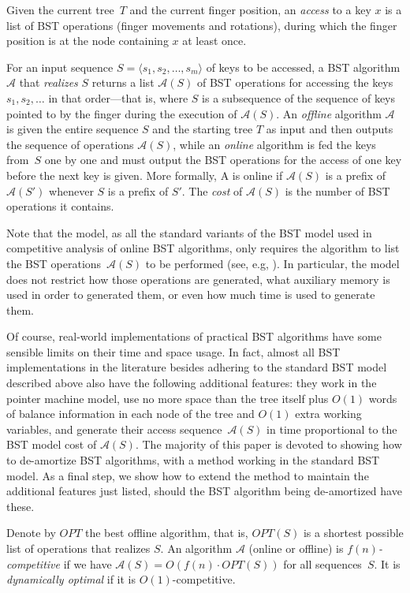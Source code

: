 \documentclass[11pt]{article}
\def\A{{\mathcal{A}}}
\begin{document}
Given the current tree~$T$ and the current finger position, an
\emph{access} to a key $x$ is a list of BST operations (finger movements
and rotations), during which the finger position is at the node containing
$x$ at least once.

For an input sequence $S=\langle s_1,s_2,\ldots,s_m\rangle$ of keys to be accessed, a
BST algorithm $\A$ that \emph{realizes} $S$ returns a list $\A(S)$ of BST
operations for accessing the keys $s_1, s_2,\ldots$ in that order---that
is, where $S$ is a subsequence of the sequence of keys pointed to by the
finger during the execution of $\A(S)$.  An \emph{offline} algorithm $\A$
is given the entire sequence $S$ and the starting tree $T$ as input and
then outputs the sequence of operations $\A(S)$, while an \emph{online}
algorithm is fed the keys from~$S$ one by one and must output the BST
operations for the access of one key before the next key is given. More
formally, A is online if $\A(S)$ is a prefix of $\A(S')$ whenever $S$ is a
prefix of $S'$. The \emph{cost} of $\A(S)$ is the number of BST operations
it contains.

Note that the model, as all the standard variants of the BST model used in
competitive analysis of online BST algorithms, only requires the algorithm
to list the BST operations~$\A(S)$ to be performed (see, e.g, \cite{wilber89}). In particular, the
model does not restrict how those operations are generated, what auxiliary
memory is used in order to generated them, or even how much time is used to
generate them.

Of course, real-world implementations of practical BST algorithms have some
sensible limits on their time and space usage. In fact, almost all BST
implementations in the literature besides adhering to the standard BST
model described above
also have the following additional features: they work in the pointer
machine model, use no more space than the tree itself plus $O(1)$ words of
balance information in each node of the tree and $O(1)$ extra working
variables, and generate their access sequence~$\A(S)$ in time proportional
to the BST model cost of $\A(S)$. The majority of this paper is devoted to
showing how to de-amortize BST algorithms, with a method working in the
standard BST model. As a final step, we show how to extend the method to
maintain the additional features just listed, should the BST algorithm
being de-amortized have these.
 
Denote by $OPT$ the best offline algorithm, that is, $OPT(S)$ is a
shortest possible list of operations that realizes $S$. An algorithm $\A$
(online or offline) is {\em $f(n)$-competitive} if we have $\A(S) =
O(f(n)\cdot OPT(S))$ for all sequences~$S$. It is {\em dynamically
optimal} if it is $O(1)$-competitive.
\end{document}
